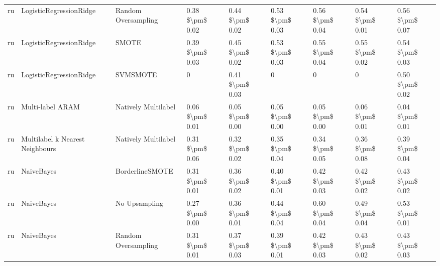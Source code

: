 \begin{tabular}{lllllllll}
      ru &         LogisticRegressionRidge &           Random Oversampling & 0.38 \$\textbackslash pm\$ 0.02 &           0.44 \$\textbackslash pm\$ 0.02 &       0.53 \$\textbackslash pm\$ 0.03 &        0.56 \$\textbackslash pm\$ 0.04 &                         0.54 \$\textbackslash pm\$ 0.01 &     0.56 \$\textbackslash pm\$ 0.07 \\
      ru &         LogisticRegressionRidge &                         SMOTE & 0.39 \$\textbackslash pm\$ 0.03 &           0.45 \$\textbackslash pm\$ 0.02 &       0.53 \$\textbackslash pm\$ 0.03 &        0.55 \$\textbackslash pm\$ 0.04 &                         0.55 \$\textbackslash pm\$ 0.02 &     0.54 \$\textbackslash pm\$ 0.03 \\
      ru &         LogisticRegressionRidge &                      SVMSMOTE &               0 &           0.41 \$\textbackslash pm\$ 0.03 &                     0 &                      0 &                                       0 &     0.50 \$\textbackslash pm\$ 0.02 \\
      ru &                Multi-label ARAM &           Natively Multilabel & 0.06 \$\textbackslash pm\$ 0.01 &           0.05 \$\textbackslash pm\$ 0.00 &       0.05 \$\textbackslash pm\$ 0.00 &        0.05 \$\textbackslash pm\$ 0.00 &                         0.06 \$\textbackslash pm\$ 0.01 &     0.04 \$\textbackslash pm\$ 0.01 \\
      ru & Multilabel k Nearest Neighbours &           Natively Multilabel & 0.31 \$\textbackslash pm\$ 0.06 &           0.32 \$\textbackslash pm\$ 0.02 &       0.35 \$\textbackslash pm\$ 0.04 &        0.34 \$\textbackslash pm\$ 0.05 &                         0.36 \$\textbackslash pm\$ 0.08 &     0.39 \$\textbackslash pm\$ 0.04 \\
      ru &                      NaiveBayes &               BorderlineSMOTE & 0.31 \$\textbackslash pm\$ 0.01 &           0.36 \$\textbackslash pm\$ 0.02 &       0.40 \$\textbackslash pm\$ 0.01 &        0.42 \$\textbackslash pm\$ 0.03 &                         0.42 \$\textbackslash pm\$ 0.02 &     0.43 \$\textbackslash pm\$ 0.02 \\
      ru &                      NaiveBayes &                 No Upsampling & 0.27 \$\textbackslash pm\$ 0.00 &           0.36 \$\textbackslash pm\$ 0.01 &       0.44 \$\textbackslash pm\$ 0.04 &        0.60 \$\textbackslash pm\$ 0.04 &                         0.49 \$\textbackslash pm\$ 0.04 &     0.53 \$\textbackslash pm\$ 0.01 \\
      ru &                      NaiveBayes &           Random Oversampling & 0.31 \$\textbackslash pm\$ 0.01 &           0.37 \$\textbackslash pm\$ 0.03 &       0.39 \$\textbackslash pm\$ 0.01 &        0.42 \$\textbackslash pm\$ 0.03 &                         0.43 \$\textbackslash pm\$ 0.02 &     0.43 \$\textbackslash pm\$ 0.03 \\

\end{tabular}
